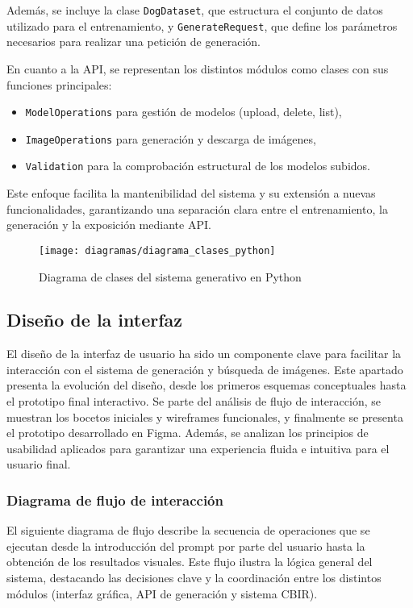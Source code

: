 Además, se incluye la clase \texttt{DogDataset}, que estructura el conjunto de datos utilizado para el entrenamiento, y \texttt{GenerateRequest}, que define los parámetros necesarios para realizar una petición de generación.

En cuanto a la API, se representan los distintos módulos como clases con sus funciones principales:
\begin{itemize}
\item \texttt{ModelOperations} para gestión de modelos (upload, delete, list),
\item \texttt{ImageOperations} para generación y descarga de imágenes,
\item \texttt{Validation} para la comprobación estructural de los modelos subidos.
\end{itemize}

Este enfoque facilita la mantenibilidad del sistema y su extensión a nuevas funcionalidades, garantizando una separación clara entre el entrenamiento, la generación y la exposición mediante API.

\begin{figure}[H]
\centering
\texttt{[image: diagramas/diagrama\_clases\_python]}
\caption{Diagrama de clases del sistema generativo en Python}
\label{fig:clases-python}
\end{figure}


\subsection{Diseño de la interfaz}
El diseño de la interfaz de usuario ha sido un componente clave para facilitar la interacción con el sistema de generación y búsqueda de imágenes. Este apartado presenta la evolución del diseño, desde los primeros esquemas conceptuales hasta el prototipo final interactivo. Se parte del análisis de flujo de interacción, se muestran los bocetos iniciales y wireframes funcionales, y finalmente se presenta el prototipo desarrollado en Figma. Además, se analizan los principios de usabilidad aplicados para garantizar una experiencia fluida e intuitiva para el usuario final.

\subsubsection{Diagrama de flujo de interacción}
El siguiente diagrama de flujo describe la secuencia de operaciones que se ejecutan desde la introducción del prompt por parte del usuario hasta la obtención de los resultados visuales. Este flujo ilustra la lógica general del sistema, destacando las decisiones clave y la coordinación entre los distintos módulos (interfaz gráfica, API de generación y sistema CBIR).


